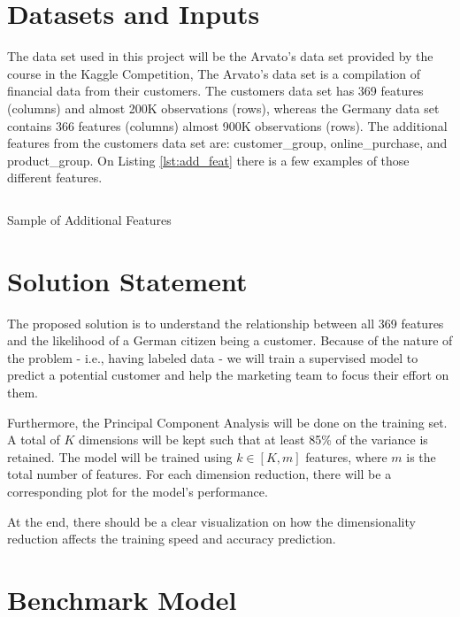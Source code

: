 \hypertarget{datasets-and-inputs}{%
\section{Datasets and Inputs}\label{datasets-and-inputs}}

The data set used in this project will be the Arvato's data set provided
by the course in the Kaggle Competition\cite{arvato_kaggle_competition},
The Arvato's data set is a compilation of financial data from their
customers. The customers data set has 369 features (columns) and almost
200K observations (rows), whereas the Germany data set contains 366
features (columns) almost 900K observations (rows). The additional
features from the customers data set are: customer\_group,
online\_purchase, and product\_group. On Listing \ref{lst:add_feat}
there is a few examples of those different features.

\begin{listing}[htp]
  \inputminted{python}{code/sample_additional_features.py}
  \caption{Sample of Additional Features}
  \label{lst:add_feat}
\end{listing}

\hypertarget{solution-statement}{%
\section{Solution Statement}\label{solution-statement}}

The proposed solution is to understand the relationship between all 369
features and the likelihood of a German citizen being a customer.
Because of the nature of the problem - i.e., having labeled data - we
will train a supervised model to predict a potential customer and help
the marketing team to focus their effort on them.

Furthermore, the Principal Component Analysis will be done on the
training set. A total of \(K\) dimensions will be kept such that at
least 85\% of the variance is retained. The model will be trained using
\(k \in \left[K,m\right]\) features, where \(m\) is the total number of
features. For each dimension reduction, there will be a corresponding
plot for the model's performance.

At the end, there should be a clear visualization on how the
dimensionality reduction affects the training speed and accuracy
prediction.

\hypertarget{benchmark-model}{%
\section{Benchmark Model}\label{benchmark-model}}

